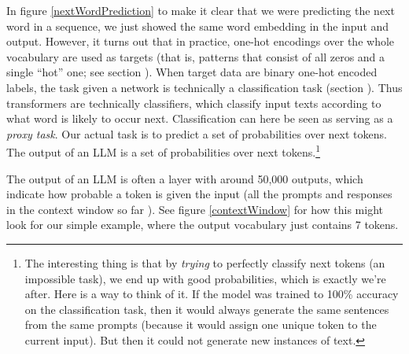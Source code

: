In figure \ref{nextWordPrediction} to make it clear that we were predicting the next word in a sequence, we just showed the same word embedding in the input and output. However, it turns out that in practice, one-hot encodings over the whole vocabulary are used as targets (that is, patterns that consist of all zeros and a single ``hot'' one; see section ). When target data are binary one-hot encoded labels, the task given a network is technically a classification task (section ). Thus transformers are technically classifiers, which classify input texts according to what word is likely to occur next. Classification can here be seen as serving as a \emph{proxy task}. Our actual task is to predict a set of probabilities over next tokens. The output of an LLM is a set of probabilities over next tokens.\footnote{The interesting thing is that by \emph{trying} to perfectly classify next tokens (an impossible task), we end up with good probabilities, which is exactly we're after. Here is a way to think of it. If the model was trained to 100\% accuracy on the classification task, then it would always generate the same sentences from the same prompts (because it would assign one unique token to the current input). But then it could not generate new instances of text.}

The output of an LLM is often a  layer with around 50,000 outputs,  which  indicate how probable a token is given the input (all the prompts and responses in the context window so far ). See figure \ref{contextWindow} for how this might look for our simple example, where the output vocabulary just contains 7 tokens.

